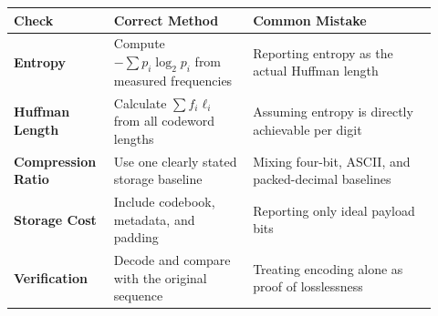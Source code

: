 \begin{tcolorbox}[
  colback=IEEEblue!5,
  colframe=IEEEblue!70!black,
  fonttitle=\bfseries\sffamily,
  toptitle=1mm,
  bottomtitle=1mm,
  boxrule=0.6pt,
  arc=0mm,
  left=3mm,right=3mm,top=1.5mm,bottom=1.5mm
]
\footnotesize
\setlength{\tabcolsep}{4pt}
\renewcommand{\arraystretch}{1.08}
\begin{tabular}{@{}>{\bfseries\RaggedRight\arraybackslash}p{0.20\linewidth}
                    >{\RaggedRight\arraybackslash}p{0.31\linewidth}
                    >{\RaggedRight\arraybackslash}p{0.41\linewidth}@{}}
  \toprule
  \textbf{Check} & \textbf{Correct Method} & \textbf{Common Mistake} \\
  \midrule
  Entropy & Compute $-\sum p_i\log_2p_i$ from measured frequencies & Reporting entropy as the actual Huffman length \\
  Huffman Length & Calculate $\sum f_i\ell_i$ from all codeword lengths & Assuming entropy is directly achievable per digit \\
  Compression Ratio & Use one clearly stated storage baseline & Mixing four-bit, ASCII, and packed-decimal baselines \\
  Storage Cost & Include codebook, metadata, and padding & Reporting only ideal payload bits \\
  Verification & Decode and compare with the original sequence & Treating encoding alone as proof of losslessness \\
  \bottomrule
\end{tabular}
\end{tcolorbox}